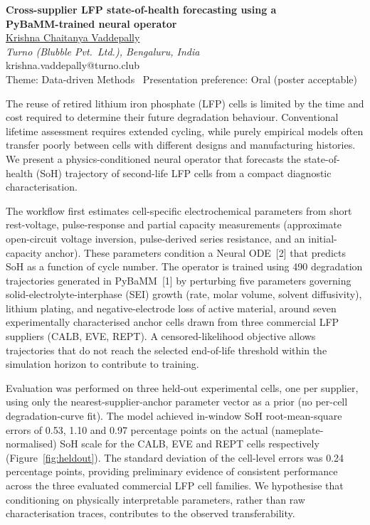 \documentclass[12pt,a4paper]{article}
\begin{document}
\enlargethispage{5\baselineskip}

\begin{center}
{\bfseries\large Cross-supplier LFP state-of-health forecasting using a\\
PyBaMM-trained neural operator}\\[0.4em]
\underline{Krishna Chaitanya Vaddepally}\\
\emph{Turno (Blubble Pvt.\ Ltd.), Bengaluru, India}\\
krishna.vaddepally@turno.club\\[0.2em]
{\footnotesize Theme: Data-driven Methods \textbullet\ Presentation preference: Oral (poster acceptable)}
\end{center}
\vspace{0.2em}

The reuse of retired lithium iron phosphate (LFP) cells is limited by the
time and cost required to determine their future degradation behaviour.
Conventional lifetime assessment requires extended cycling, while purely
empirical models often transfer poorly between cells with different
designs and manufacturing histories. We present a physics-conditioned
neural operator that forecasts the state-of-health (SoH) trajectory of
second-life LFP cells from a compact diagnostic characterisation.

The workflow first estimates cell-specific electrochemical parameters
from short rest-voltage, pulse-response and partial capacity
measurements (approximate open-circuit voltage inversion, pulse-derived
series resistance, and an initial-capacity anchor). These parameters
condition a Neural ODE~[2] that predicts SoH as a function of cycle
number. The operator is trained using 490 degradation trajectories
generated in PyBaMM~[1] by perturbing five parameters governing
solid-electrolyte-interphase (SEI) growth (rate, molar volume, solvent
diffusivity), lithium plating, and negative-electrode loss of active
material, around seven experimentally characterised anchor cells drawn
from three commercial LFP suppliers (CALB, EVE, REPT). A
censored-likelihood objective allows trajectories that do not reach the
selected end-of-life threshold within the simulation horizon to
contribute to training.

Evaluation was performed on three held-out experimental cells, one per
supplier, using only the nearest-supplier-anchor parameter vector as a
prior (no per-cell degradation-curve fit). The model achieved in-window
SoH root-mean-square errors of 0.53, 1.10 and 0.97 percentage points on
the actual (nameplate-normalised) SoH scale for the CALB, EVE and REPT
cells respectively (Figure~\ref{fig:heldout}). The standard deviation of
the cell-level errors was 0.24 percentage points, providing preliminary
evidence of consistent performance across the three evaluated commercial
LFP cell families. We hypothesise that conditioning on physically
interpretable parameters, rather than raw characterisation traces,
contributes to the observed transferability.
\end{document}
